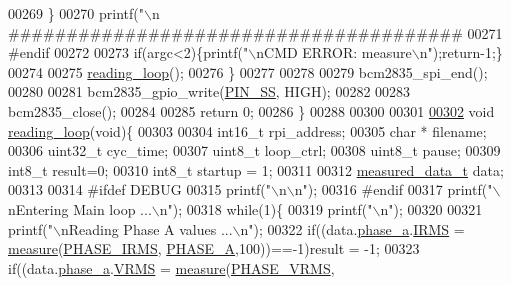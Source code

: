 \begin{DoxyCode}
{{{{{00269         \}   
00270         printf(\textcolor{stringliteral}{"\(\backslash\)n
      #######################################%
00271 \textcolor{preprocessor}{        #endif}
00272 \textcolor{preprocessor}{}        
00273         \textcolor{keywordflow}{if}(argc<2)\{printf(\textcolor{stringliteral}{"\(\backslash\)nCMD ERROR: measure\(\backslash\)n"});\textcolor{keywordflow}{return}-1;\} 
00274            
00275            \hyperlink{a00002_gaeb3af492d3421787fcbb2cd1bbbaf62c}{reading\_loop}();
00276      \}
00277 
00278      
00279      bcm2835\_spi\_end();
00280        
00281      bcm2835\_gpio\_write(\hyperlink{a00038_ab4b553591a495409d4f7cec4b6c3e754}{PIN\_SS}, HIGH);
00282        
00283      bcm2835\_close();
00284      
00285 \textcolor{keywordflow}{return} 0;
00286 \}
00288 
00300 
00301 
\hypertarget{a00034_source_l00302}{}\hyperlink{a00002_gaeb3af492d3421787fcbb2cd1bbbaf62c}{00302} \textcolor{keywordtype}{void} \hyperlink{a00002_gaeb3af492d3421787fcbb2cd1bbbaf62c}{reading\_loop}(\textcolor{keywordtype}{void})\{
00303 
00304   int16\_t   rpi\_address; 
00305   \textcolor{keywordtype}{char} *    filename;
00306   uint32\_t  cyc\_time;
00307   uint8\_t   loop\_ctrl;
00308   uint8\_t   pause;
00309   int8\_t    result=0;
00310   int8\_t startup = 1;
00311   
00312     \hyperlink{a00028}{measured\_data\_t} data;
00313     
00314 \textcolor{preprocessor}{        #ifdef DEBUG }
00315 \textcolor{preprocessor}{}        printf(\textcolor{stringliteral}{"\(\backslash\)n\(\backslash\)n"});
00316 \textcolor{preprocessor}{        #endif  }
00317 \textcolor{preprocessor}{}         printf(\textcolor{stringliteral}{"\(\backslash\)nEntering Main loop ...\(\backslash\)n"});
00318          \textcolor{keywordflow}{while}(1)\{  
00319          printf(\textcolor{stringliteral}{"\(\backslash\)n"});
00320          
00321          printf(\textcolor{stringliteral}{"\(\backslash\)nReading Phase A values ...\(\backslash\)n"});   
00322          \textcolor{keywordflow}{if}((data.\hyperlink{a00028_ad7205e9853a503d2fab0697f5a301f6c}{phase\_a}.\hyperlink{a00029_a4f87f30b543e89e2e5dfa1b8f3f58eff}{IRMS}           = \hyperlink{a00008_gac914ebaa64afce03ee852af09659cf69}{measure}(\hyperlink{a00042_a15c9ccf287820001431c33c4bb25a23b}{PHASE\_IRMS},
      \hyperlink{a00042_ad214039f52b011ce2bd6c85ff98a981b}{PHASE\_A},100))==-1)result = -1;
00323          \textcolor{keywordflow}{if}((data.\hyperlink{a00028_ad7205e9853a503d2fab0697f5a301f6c}{phase\_a}.\hyperlink{a00029_a08415029e214174a01bc6487ff98ee9b}{VRMS}           = \hyperlink{a00008_gac914ebaa64afce03ee852af09659cf69}{measure}(\hyperlink{a00042_af0c09c5a455410e6fbd35fd55221338f}{PHASE\_VRMS},
}}}}}}
\end{DoxyCode}
